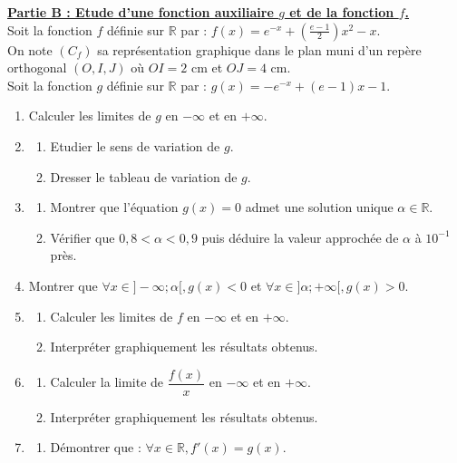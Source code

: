 \documentclass[12pt,a4paper]{article}
\begin{document}
\noindent \underline{\textbf{Partie B : Etude d'une fonction auxiliaire $g$ et de la fonction $f$.}} \\
Soit la fonction $f$ définie sur $\mathbb{R}$ par : $f(x) = e^{-x} + \left(\frac{e-1}{2}\right)x^2 - x$. \\
On note $(C_f)$ sa représentation graphique dans le plan muni d'un repère orthogonal $(O, I, J)$ où $OI=2$ cm et $OJ = 4$ cm. \\
Soit la fonction $g$ définie sur $\mathbb{R}$ par : $g(x) = -e^{-x} + (e-1)x - 1$.
\begin{enumerate}
    \item Calculer les limites de $g$ en $-\infty$ et en $+\infty$.
    \item \begin{enumerate}
        \item Etudier le sens de variation de $g$.
        \item Dresser le tableau de variation de $g$.
    \end{enumerate}
    \item \begin{enumerate}
        \item Montrer que l'équation $g(x) = 0$ admet une solution unique $\alpha \in \mathbb{R}$.
        \item Vérifier que $0,8 < \alpha < 0,9$ puis déduire la valeur approchée de $\alpha$ à $10^{-1}$ près.
    \end{enumerate}
    \item Montrer que $\forall x \in ]-\infty; \alpha[, g(x) < 0$ et $\forall x \in ]\alpha; +\infty[, g(x) > 0$.
    \item \begin{enumerate}
        \item Calculer les limites de $f$ en $-\infty$ et en $+\infty$.
        \item Interpréter graphiquement les résultats obtenus.
    \end{enumerate}
    \item \begin{enumerate}
        \item Calculer la limite de $\dfrac{f(x)}{x}$ en $-\infty$ et en $+\infty$.
        \item Interpréter graphiquement les résultats obtenus.
    \end{enumerate}
    \item \begin{enumerate}
        \item Démontrer que : $\forall x \in \mathbb{R}, f'(x) = g(x)$.

\end{enumerate}
\end{enumerate}
\end{document}
